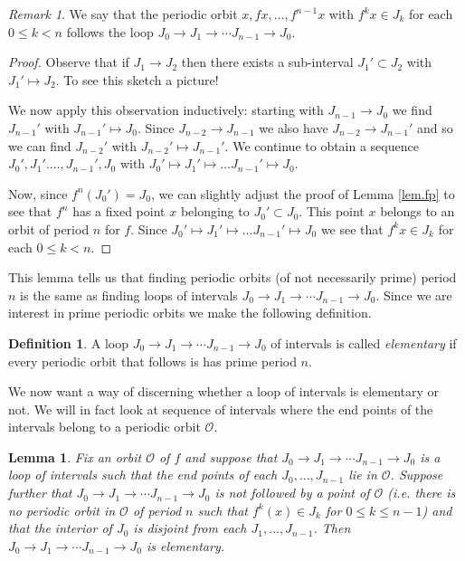 \documentclass[12pt]{article}
\newtheorem{lemma}[theorem]{Lemma}
\theoremstyle{definition}
\newtheorem{definition}[theorem]{Definition}
\theoremstyle{remark}
\newtheorem{remark}[theorem]{Remark}
\begin{document}
\begin{remark}
We say that the periodic orbit $x, fx, \ldots, f^{n-1}x$ with $f^kx \in J_k$ for each $0 \le k < n$ follows the loop $J_0 \to J_1 \to \cdots J_{n-1} \to J_0$.
\end{remark}

\begin{proof}
Observe that if $J_1 \to J_2$ then there exists a sub-interval $J_1' \subset J_2$ with $J_1' \mapsto J_2$. To see this sketch a picture!

We now apply this observation inductively: starting with $J_{n-1} \to J_0$ we find $J_{n-1}' $ with $J_{n-1}' \mapsto J_0$. Since $J_{n-2} \to J_{n-1}$ we also have $J_{n-2} \to J_{n-1}'$ and so we can find $J_{n-2}'$ with $J_{n-2}' \mapsto J_{n-1}'$. We continue to obtain a sequence $J_0', J_1'. \ldots, J_{n-1}', J_0$ with $J_0'\mapsto J_1' \mapsto \ldots J_{n-1}' \mapsto J_0$.

Now, since $f^n(J_0') = J_0$,
we can slightly adjust the proof of Lemma \ref{lem.fp} to see that $f^n$ has a fixed point $x$ belonging to $J_0' \subset J_0$. This point $x$ belongs to an orbit of period $n$ for $f$. Since $J_0'\mapsto J_1' \mapsto \ldots J_{n-1}' \mapsto J_0$ we see that $f^kx \in J_k$ for each $0 \le k < n$.
\end{proof}

This lemma tells us that finding periodic orbits (of not necessarily prime) period $n$ is the same as finding loops of intervals $J_0 \to J_1 \to \cdots J_{n-1} \to J_0$. Since we are interest in prime periodic orbits we make the following definition.

\begin{definition}
A loop $J_0 \to J_1 \to \cdots J_{n-1} \to J_0$ of intervals is called \textit{elementary} if every periodic orbit that follows is has prime period $n$.
\end{definition}

We now want a way of discerning whether a loop of intervals is elementary or not. We will in fact look at sequence of intervals where the end points of the intervals belong to a periodic orbit $\mathcal{O}$.

\begin{lemma}\label{lem.elem}
Fix an orbit $\mathcal{O}$ of $f$ and suppose that $J_0 \to J_1 \to \cdots J_{n-1} \to J_0$ is a loop of intervals such that the end points of each $J_0, \ldots, J_{n-1}$ lie in $\mathcal{O}$. Suppose further that $J_0 \to J_1 \to \cdots J_{n-1} \to J_0$ is not followed by a point of $\mathcal{O}$ (i.e. there is no periodic orbit in $\mathcal{O}$ of period $n$ such that $f^k(x) \in J_k$ for $0\le k\le n-1$) and that the interior of $J_0$ is disjoint from each $J_1, \ldots, J_{n-1}$. Then $J_0 \to J_1 \to \cdots J_{n-1} \to J_0$ is elementary. 
\end{lemma}
\end{document}
